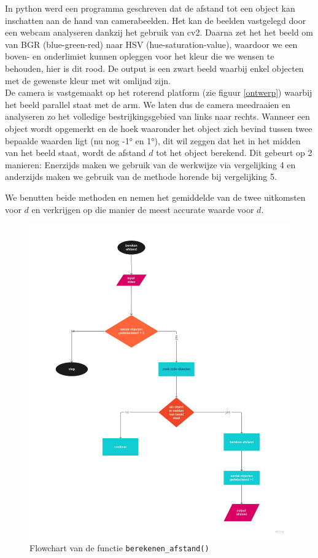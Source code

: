 \documentclass[kulak]{kulakarticle} %
\begin{document}
			In python werd een programma geschreven dat de afstand tot een object kan inschatten aan de hand van camerabeelden. Het kan de beelden vastgelegd door een webcam analyseren dankzij het gebruik van cv2. Daarna zet het het beeld om van BGR (blue-green-red) naar HSV (hue-saturation-value), waardoor we een boven- en onderlimiet kunnen opleggen voor het kleur die we wensen te behouden, hier is dit rood. De output is een zwart beeld waarbij enkel objecten met de gewenste kleur met wit omlijnd zijn.\\
			De camera is vastgemaakt op het roterend platform (zie figuur \ref{ontwerp}) waarbij het beeld parallel staat met de arm. We laten dus de camera meedraaien en analyseren zo het volledige bestrijkingsgebied van links naar rechts. Wanneer een object wordt opgemerkt en de hoek waaronder het object zich bevind tussen twee bepaalde waarden ligt (nu nog -1° en 1°), dit wil zeggen dat het in het midden van het beeld staat, wordt de afstand \(d\) tot het object berekend. Dit gebeurt op 2 manieren: Enerzijds maken we gebruik van de werkwijze via vergelijking 4 en anderzijds maken we gebruik van de methode horende bij vergelijking 5.
				
			We benutten beide methoden en nemen het gemiddelde van de twee uitkomsten voor \(d\) en verkrijgen op die manier de meest accurate waarde voor \(d\).


				\begin{figure} [!h]
					\centering
					\includegraphics[width = 0.8 \textwidth]{flowchart afstand berekenen.pdf}
				\cprotect\caption{Flowchart van de functie \verb*|berekenen_afstand()|}
				\end{figure}
 
\end{document}

